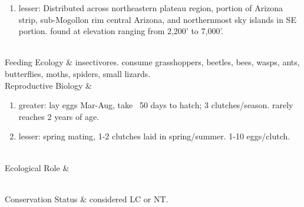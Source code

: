 \begin{center}
\begin{longtabu}
\begin{enumerate}
		\item lesser: Distributed across northeastern plateau region, portion of Arizona strip, sub-Mogollon rim central Arizona, and northernmost sky islands in SE portion. found at elevation  ranging from 2,200' to 7,000'.
	\end{enumerate}
	\\
	\hline
	Feeding Ecology & 
	insectivores. consume grasshoppers, beetles, bees, wasps, ants, butterflies, moths, spiders, small lizards.
	\\
	\hline
	Reproductive Biology & 
	\begin{enumerate}
		\item greater: lay eggs Mar-Aug, take ~50 days to hatch; 3 clutches/season. rarely reaches 2 years of age.
		\item lesser: spring mating, 1-2 clutches laid in spring/summer. 1-10 eggs/clutch.
	\end{enumerate}
	\\
	\hline
	Ecological Role &
	
	\\
	\hline
	Conservation Status & 
	considered LC or NT.
	\\
	\hline
\end{longtabu}
\end{center}